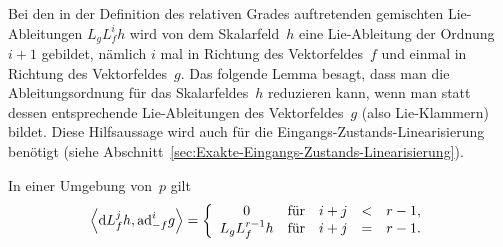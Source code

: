 Bei den in der Definition des relativen Grades auftretenden gemischten
Lie-Ableitungen $L_{g}L_{f}^{i}h$ wird von dem Skalarfeld~$h$ eine
Lie-Ableitung der Ordnung $i+1$ gebildet, nämlich $i$ mal in Richtung
des Vektorfeldes~$f$ und einmal in Richtung des Vektorfeldes~$g$.
Das folgende Lemma besagt, dass man die Ableitungsordnung für das
Skalarfeldes~$h$ reduzieren kann, wenn man statt dessen entsprechende
Lie-Ableitungen des Vektorfeldes~$g$ (also Lie-Klammern) bildet.
Diese Hilfsaussage wird auch für die Eingangs-Zustands-Linearisierung
benötigt (siehe Abschnitt~\ref{sec:Exakte-Eingangs-Zustands-Linearisierung}).
\begin{lemma}
\label{lem:Skalarprod-dLf-ad}In einer Umgebung von~$p$ gilt 
\begin{equation}
\left\langle {\mathrm{d}} L_{f}^{j}h,{\operatorname{ad}}_{-f}^{i}g\right\rangle =\left\{ \begin{array}{ccccc}
0 & \mbox{für} & i+j & < & r-1,\\
L_{g}L_{f}^{r-1}h & \mbox{für} & i+j & = & r-1.
\end{array}\right.\label{eq:SP-dLfj,adi}
\end{equation}
\end{lemma}
